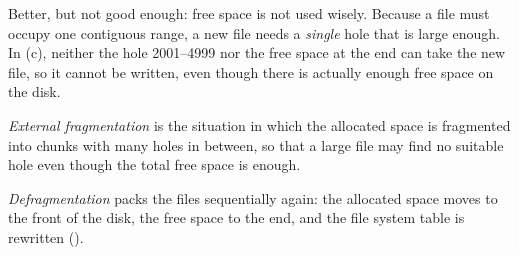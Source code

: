 Better, but not good enough: free space is not used wisely. Because a file must occupy one contiguous range, a new file needs a \emph{single} hole that is large enough. In (c), neither the hole 2001--4999 nor the free space at the end can take the new file, so it cannot be written, even though there is actually enough free space on the disk.

\begin{definition}
  \emph{External fragmentation} is the situation in which the allocated space is fragmented into chunks with many holes in between, so that a large file may find no suitable hole even though the total free space is enough.
\end{definition}

\begin{definition}[Defragmentation]
  \emph{Defragmentation} packs the files sequentially again: the allocated space moves to the front of the disk, the free space to the end, and the file system table is rewritten ().
\end{definition}

